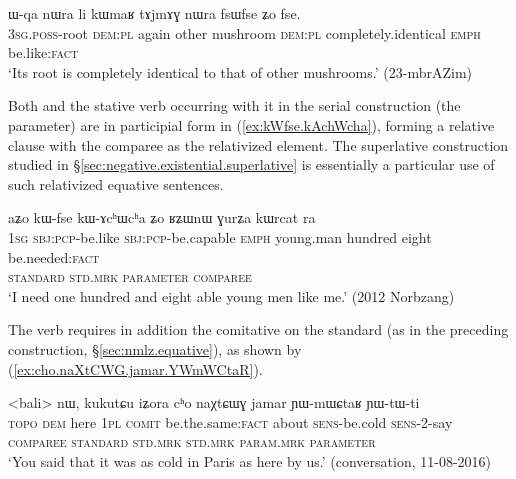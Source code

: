 \begin{exe} 
	\ex \label{ex:fsWfse.Zo.fse}
	\gll ɯ-qa nɯra li kɯmaʁ tɤjmɤɣ nɯra fsɯfse ʑo fse. \\
	\textsc{3sg}.\textsc{poss}-root \textsc{dem}:\textsc{pl} again other mushroom \textsc{dem}:\textsc{pl} completely.identical \textsc{emph} be.like:\textsc{fact} \\
	\glt `Its root is completely identical to that of other mushrooms.' (23-mbrAZim)
\end{exe}


Both  and the stative verb occurring with it in the serial construction (the parameter) are in participial form in (\ref{ex:kWfse.kAchWcha}), forming a relative clause with the comparee as the relativized element. The superlative construction studied in §\ref{sec:negative.existential.superlative} is essentially a particular use of such relativized equative sentences.

\begin{exe}
\ex \label{ex:kWfse.kAchWcha}
\glll aʑo kɯ-fse kɯ-ɤcʰɯcʰa ʑo ʁʑɯnɯ ɣurʑa kɯrcat ra\\
\textsc{1sg} \textsc{sbj}:\textsc{pcp}-be.like \textsc{sbj}:\textsc{pcp}-be.capable \textsc{emph} young.man hundred eight be.needed:\textsc{fact} \\
\textsc{standard} \textsc{std}.\textsc{mrk} \textsc{parameter} { } \textsc{comparee} \\
\glt `I need one hundred and eight able young men like me.' (2012 Norbzang)
\end{exe}

The verb  requires in addition the comitative  on the standard (as in the preceding construction, §\ref{sec:nmlz.equative}), as shown by (\ref{ex:cho.naXtCWG.jamar.YWmWCtaR}).

\begin{exe}
\ex \label{ex:cho.naXtCWG.jamar.YWmWCtaR}
\glll <bali> nɯ, kukutɕu iʑora cʰo naχtɕɯɣ jamar ɲɯ-mɯɕtaʁ ɲɯ-tɯ-ti\\
\textsc{topo} \textsc{dem} here \textsc{1pl} \textsc{comit} be.the.same:\textsc{fact} about \textsc{sens}-be.cold \textsc{sens}-2-say\\
\textsc{comparee} { }  \textsc{standard} \textsc{std}.\textsc{mrk} \textsc{std}.\textsc{mrk}  \textsc{param}.\textsc{mrk} \textsc{parameter}\\
\glt `You said that it was as cold in Paris as here by us.' (conversation, 11-08-2016)
\end{exe}




